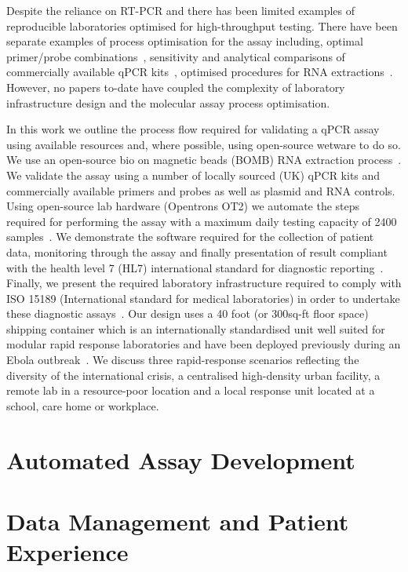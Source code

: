 \documentclass[a4paper,12pt]{article}
\begin{document}
Despite the reliance on RT-PCR and there has been limited examples of reproducible laboratories optimised for high-throughput testing. There have been separate examples of process optimisation for the assay including, optimal primer/probe combinations~\cite{Casto2020}, sensitivity and analytical comparisons of commercially available qPCR kits~\cite{Vogels2020}, optimised procedures for RNA extractions~\cite{Ladha,Grant2020}. However, no papers to-date have coupled the complexity of laboratory infrastructure design and the molecular assay process optimisation. 

In this work we outline the process flow required for validating a qPCR assay using available resources and, where possible, using open-source wetware to do so. We use an open-source bio on magnetic beads (BOMB) RNA extraction process~\cite{Oberacker2019}. We validate the assay using a number of locally sourced (UK) qPCR kits and commercially available primers and probes as well as plasmid and RNA controls. Using open-source lab hardware (Opentrons OT2) we automate the steps required for performing the assay with a maximum daily testing capacity of 2400 samples~\cite{}. We demonstrate the software required for the collection of patient data, monitoring through the assay and finally presentation of result compliant with the health level 7 (HL7) international standard for diagnostic reporting~\cite{}. Finally, we present the required laboratory infrastructure required to comply with ISO 15189 (International standard for medical laboratories) in order to undertake these diagnostic assays~\cite{}. Our design uses a 40 foot (or 300sq-ft floor space) shipping container which is an internationally standardised unit well suited for modular rapid response laboratories and have been deployed previously during an Ebola outbreak~\cite{Wolfel2015,Raftery2018,BKosloff2013,Bridges2014}. We discuss three rapid-response scenarios reflecting the diversity of the international crisis, a centralised high-density urban facility, a remote lab in a resource-poor location and a local response unit located at a school, care home or workplace.

\section{Automated Assay Development} 

\section{Data Management and Patient Experience}
\end{document}
